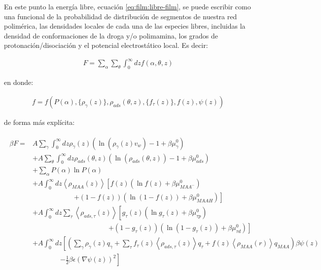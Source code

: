 En este punto la energ\'ia libre, ecuaci\'on \ref{eq:film:libre-film}, se puede escribir como una funcional de la probabilidad de distribuci\'on de segmentos de nuestra red polim\'erica, las densidades locales de cada una de las especies libres, incluidas la densidad de conformaciones de la droga y/o polimamina, los grados de protonaci\'on/disociaci\'on y el potencial electrost\'atico local. Es decir:

\begin{align}
	F = \sum_\alpha \sum_\theta \int_0^\infty dz f(\alpha, \theta,z)
\end{align}

\noindent en donde:

\begin{align}
	 f=  f \left( P(\alpha), \{\rho_\gamma(z)\},\rho_{ads}(\theta, z), \{f_\tau(z)\}, f(z), \psi(z)  \right)
	 \label{eq:film:funcionales}
 \end{align}

\noindent de forma m\'as expl\'icita:

\begin{align}
	\begin{aligned}
		\beta F=  & A\sum_{\gamma}\int_0^\infty{dz\rho_\gamma(z)\left(\ln \left(\rho_\gamma (z)v_w\right) -1 + \beta\mu^0_\gamma\right)} \\
		&+ A\sum_{\theta}\int_0^\infty{dz\rho_{ads}(\theta,z)\left(\ln \left(\rho_{ads}(\theta,z)\right) -1 + \beta\mu^0_{ads} \right)} \\
		&+ \sum_\alpha{P(\alpha)\ln P(\alpha)} \\
		& + A\int_0^\infty dz \left<\rho_{MAA}(z)\right> \left[f(z)(\ln f(z)+ \beta\mu^0_{MAA^-})\right.\\
		& \qquad\qquad\qquad \left.+(1-f(z))\left(\ln (1-f(z))+\beta\mu^0_{MAAH}\right)\right] \\
		& + A\int_0^\infty dz \sum_\tau \left<\rho_{ads,\tau}(z)\right> \left[g_\tau(z)(\ln g_\tau(z)+ \beta\mu^0_{\tau p})\right.\\
		&\qquad \qquad \qquad\qquad \qquad\quad \left.+(1-g_\tau(z))(\ln (1-g_\tau(z))+\beta\mu^0_{\tau d})\right]   \\
		 & +A\int_0^\infty dz \left[\left(\sum_{\gamma } {\rho_\gamma(z) q_\gamma + \sum_\tau{f_\tau(z) \left<\rho_{ads,\tau}(z)\right> q_\tau} +  f(z)\left<\rho_{MAA}(r)\right>q_{MAA}}\right)\beta\psi(z) \right. \\ & \qquad \qquad \left.-\frac{1}{2}\beta\epsilon(\nabla\psi(z))^2 \right]
		\end{aligned}
\end{align}


